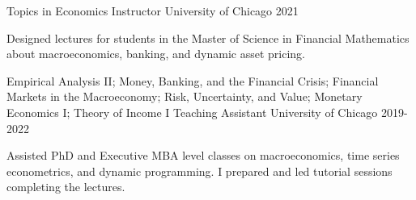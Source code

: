 

\begin{cventries}
	\cventry
	{Topics in Economics}
	{Instructor}
	{University of Chicago}
	{2021}
	{\begin{cvitems}
			\item Designed lectures for students in the Master of Science in Financial Mathematics about macroeconomics, banking, and dynamic asset pricing.
		\end{cvitems}}

	\cventry
	{Empirical Analysis II; Money, Banking, and the Financial Crisis; Financial Markets in the Macroeconomy; Risk, Uncertainty, and Value; Monetary Economics I; Theory of Income I}
	{Teaching Assistant}
	{University of Chicago}
	{2019-2022}
	{\begin{cvitems}
			\item Assisted PhD and Executive MBA level classes on macroeconomics, time series econometrics, and dynamic programming. I prepared and led tutorial sessions completing the lectures.
		\end{cvitems}}
\end{cventries}
